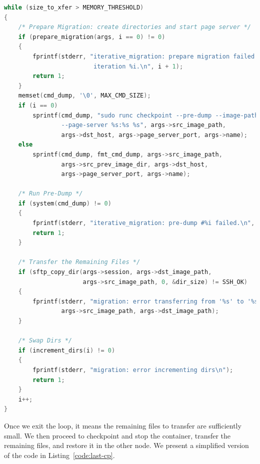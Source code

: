 \begin{lstlisting}[language=C,caption={Iterative migration internal loop.},label={code:iterative-loop}]
while (size_to_xfer > MEMORY_THRESHOLD)
{
    /* Prepare Migration: create directories and start page server */
    if (prepare_migration(args, i == 0) != 0)
    {
        fprintf(stderr, "iterative_migration: prepare migration failed at \
                         iteration %i.\n", i + 1);
        return 1;
    }
    memset(cmd_dump, '\0', MAX_CMD_SIZE);
    if (i == 0)
        sprintf(cmd_dump, "sudo runc checkpoint --pre-dump --image-path %s \
                --page-server %s:%s %s", args->src_image_path, 
                args->dst_host, args->page_server_port, args->name);
    else
        sprintf(cmd_dump, fmt_cmd_dump, args->src_image_path,
                args->src_prev_image_dir, args->dst_host,
                args->page_server_port, args->name);

    /* Run Pre-Dump */
    if (system(cmd_dump) != 0)
    {
        fprintf(stderr, "iterative_migration: pre-dump #%i failed.\n", i);
        return 1;
    }

    /* Transfer the Remaining Files */
    if (sftp_copy_dir(args->session, args->dst_image_path, 
                      args->src_image_path, 0, &dir_size) != SSH_OK)
    {
        fprintf(stderr, "migration: error transferring from '%s' to '%s'\n",
                args->src_image_path, args->dst_image_path);
    }

    /* Swap Dirs */
    if (increment_dirs(i) != 0)
    {
        fprintf(stderr, "migration: error incrementing dirs\n");
        return 1;
    }
    i++;
}
\end{lstlisting}
Once we exit the loop, it means the remaining files to transfer are sufficiently small.
We then proceed to checkpoint and stop the container, transfer the remaining files, and restore it in the other node.
We present a simplified version of the code in Listing~\ref{code:last-cp}.
